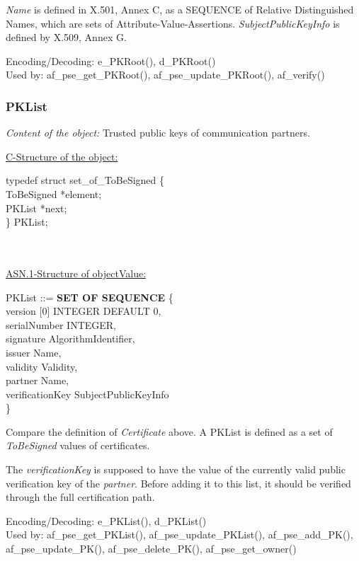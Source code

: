{\em Name} is defined in X.501, Annex C,
as a SEQUENCE of Relative Distinguished Names,
which are sets of Attribute-Value-Assertions.
{\em SubjectPublicKeyInfo} is defined by X.509, Annex G.


Encoding/Decoding: e\_PKRoot(), d\_PKRoot() \\
Used by: af\_pse\_get\_PKRoot(), af\_pse\_update\_PKRoot(), af\_verify()

\subsubsection{PKList}
{\em Content of the object:} Trusted public keys of communication partners.
 
\underline{C-Structure of the object:}

{\small
\bvtab
\4      typedef struct set\_of\_ToBeSigned \{ \\
\6              ToBeSigned   \3 *element; \\
\6              PKList       \3 *next; \\
\4      \} PKList; \\ \\ \\
\evtab
}


\underline{ASN.1-Structure of objectValue:}

{\small
\bvtab
\3 PKList ::= \3 {\bf SET OF SEQUENCE} \{  \\
\7 version [0]     \3 INTEGER DEFAULT 0,       \\
\7 serialNumber    \3 INTEGER,                 \\
\7 signature       \3 AlgorithmIdentifier,     \\
\7 issuer          \3 Name,                    \\
\7 validity        \3 Validity,                \\
\7 partner         \3 Name,                    \\
\7 verificationKey \3 SubjectPublicKeyInfo \\
\6 \}
\evtab
}
 
Compare the definition of {\em Certificate} above. A PKList is defined
as a set of {\em ToBeSigned} values of certificates.
 
The {\em verificationKey} is supposed to have the value
of the currently valid public verification key of the {\em partner}.
Before adding it to this list, it should be verified through
the full certification path.


Encoding/Decoding: e\_PKList(), d\_PKList() \\
Used by: af\_pse\_get\_PKList(), af\_pse\_update\_PKList(), af\_pse\_add\_PK(), af\_pse\_update\_PK(),
af\_pse\_delete\_PK(), af\_pse\_get\_owner()


